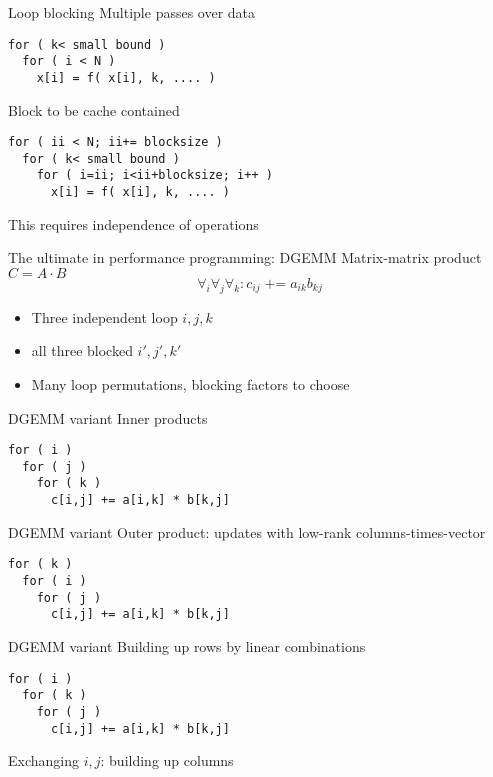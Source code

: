 \begin{numberedframe}{Loop blocking}
Multiple passes over data
\begin{verbatim}
for ( k< small bound )
  for ( i < N )
    x[i] = f( x[i], k, .... )
\end{verbatim}
Block to be cache contained
\begin{verbatim}
for ( ii < N; ii+= blocksize )
  for ( k< small bound )
    for ( i=ii; i<ii+blocksize; i++ )
      x[i] = f( x[i], k, .... )
\end{verbatim}
This requires independence of operations
\end{numberedframe}

\begin{numberedframe}{The ultimate in performance programming: DGEMM}
  Matrix-matrix product $C=A\cdot B$
  \[ \forall_i\forall_j\forall_k\colon c_{ij}\mathop{+=} a_{ik}b_{kj} \]
  \begin{itemize}
  \item Three independent loop $i,j,k$
  \item all three blocked $i',j',k'$
  \item Many loop permutations, blocking factors to choose
  \end{itemize}
\end{numberedframe}

\begin{numberedframe}{DGEMM variant}
Inner products
\begin{verbatim}
for ( i )
  for ( j )
    for ( k )
      c[i,j] += a[i,k] * b[k,j]
\end{verbatim}
\end{numberedframe}

\begin{numberedframe}{DGEMM variant}
Outer product: updates with low-rank columns-times-vector
\begin{verbatim}
for ( k )
  for ( i )
    for ( j )
      c[i,j] += a[i,k] * b[k,j]
\end{verbatim}
\end{numberedframe}

\begin{numberedframe}{DGEMM variant}
Building up rows by linear combinations
\begin{verbatim}
for ( i )
  for ( k )
    for ( j )
      c[i,j] += a[i,k] * b[k,j]
\end{verbatim}
Exchanging $i,j$: building up columns
\end{numberedframe}

